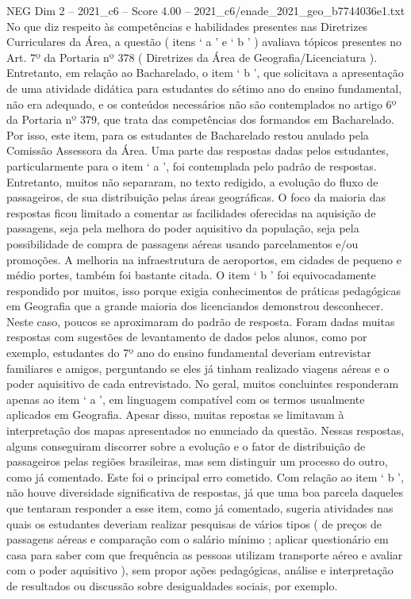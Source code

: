 \begin{textsample}{NEG Dim 2 – 2021\_c6 – Score 4.00 – 2021\_c6/enade\_2021\_geo\_b7744036e1.txt}
No que diz respeito às competências e habilidades presentes nas Diretrizes Curriculares da Área, a questão ( itens ‘ a ’ e ‘ b ’ ) avaliava tópicos presentes no Art. 7º da Portaria nº 378 ( Diretrizes da Área de Geografia/Licenciatura ).
Entretanto, em relação ao Bacharelado, o item ‘ b ’, que solicitava a apresentação de uma atividade didática para estudantes do sétimo ano do ensino fundamental, não era adequado, e os conteúdos necessários não são contemplados no artigo 6º da Portaria nº 379, que trata das competências dos formandos em Bacharelado.
Por isso, este item, para os estudantes de Bacharelado restou anulado pela Comissão Assessora da Área.
Uma parte das respostas dadas pelos estudantes, particularmente para o item ‘ a ’, foi contemplada pelo padrão de respostas.
Entretanto, muitos não separaram, no texto redigido, a evolução do fluxo de passageiros, de sua distribuição pelas áreas geográficas.
O foco da maioria das respostas ficou limitado a comentar as facilidades oferecidas na aquisição de passagens, seja pela melhora do poder aquisitivo da população, seja pela possibilidade de compra de passagens aéreas usando parcelamentos e/ou promoções.
A melhoria na infraestrutura de aeroportos, em cidades de pequeno e médio portes, também foi bastante citada.
O item ‘ b ’ foi equivocadamente respondido por muitos, isso porque exigia conhecimentos de práticas pedagógicas em Geografia que a grande maioria dos licenciandos demonstrou desconhecer.
Neste caso, poucos se aproximaram do padrão de resposta.
Foram dadas muitas respostas com sugestões de levantamento de dados pelos alunos, como por exemplo, estudantes do 7º ano do ensino fundamental deveriam entrevistar familiares e amigos, perguntando se eles já tinham realizado viagens aéreas e o poder aquisitivo de cada entrevistado.
No geral, muitos concluintes responderam apenas ao item ‘ a ’, em linguagem compatível com os termos usualmente aplicados em Geografia.
Apesar disso, muitas repostas se limitavam à interpretação dos mapas apresentados no enunciado da questão.
Nessas respostas, alguns conseguiram discorrer sobre a evolução e o fator de distribuição de passageiros pelas regiões brasileiras, mas sem distinguir um processo do outro, como já comentado.
Este foi o principal erro cometido.
Com relação ao item ‘ b ’, não houve diversidade significativa de respostas, já que uma boa parcela daqueles que tentaram responder a esse item, como já comentado, sugeria atividades nas quais os estudantes deveriam realizar pesquisas de vários tipos ( de preços de passagens aéreas e comparação com o salário mínimo ; aplicar questionário em casa para saber com que frequência as pessoas utilizam transporte aéreo e avaliar com o poder aquisitivo ), sem propor ações pedagógicas, análise e interpretação de resultados ou discussão sobre desigualdades sociais, por exemplo.

\end{textsample}
